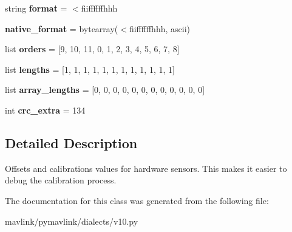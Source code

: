 \begin{DoxyCompactItemize}
\item 
\mbox{\label{classpymavlink_1_1dialects_1_1v10_1_1MAVLink__sensor__offsets__message_a06da8a5406bdc15ad1c584493f8008f8}} 
string {\bfseries format} = \textquotesingle{}$<$fiiffffffhhh\textquotesingle{}
\item 
\mbox{\label{classpymavlink_1_1dialects_1_1v10_1_1MAVLink__sensor__offsets__message_af12cdd0744f15b80aed572658bc3bbff}} 
{\bfseries native\+\_\+format} = bytearray(\textquotesingle{}$<$fiiffffffhhh\textquotesingle{}, \textquotesingle{}ascii\textquotesingle{})
\item 
\mbox{\label{classpymavlink_1_1dialects_1_1v10_1_1MAVLink__sensor__offsets__message_a50876f462a4e2cdf40ddb6a3dd9cd54f}} 
list {\bfseries orders} = \mbox{[}9, 10, 11, 0, 1, 2, 3, 4, 5, 6, 7, 8\mbox{]}
\item 
\mbox{\label{classpymavlink_1_1dialects_1_1v10_1_1MAVLink__sensor__offsets__message_a6f9c5e5df07f175a5e827ae881260cb9}} 
list {\bfseries lengths} = \mbox{[}1, 1, 1, 1, 1, 1, 1, 1, 1, 1, 1, 1\mbox{]}
\item 
\mbox{\label{classpymavlink_1_1dialects_1_1v10_1_1MAVLink__sensor__offsets__message_a5b9eeb85421892f9f426a3464c284a1b}} 
list {\bfseries array\+\_\+lengths} = \mbox{[}0, 0, 0, 0, 0, 0, 0, 0, 0, 0, 0, 0\mbox{]}
\item 
\mbox{\label{classpymavlink_1_1dialects_1_1v10_1_1MAVLink__sensor__offsets__message_a9c347e3d7f05535eaf1f38d7acb93b7a}} 
int {\bfseries crc\+\_\+extra} = 134
\end{DoxyCompactItemize}


\subsection{Detailed Description}
\begin{DoxyVerb}Offsets and calibrations values for hardware sensors. This
makes it easier to debug the calibration process.
\end{DoxyVerb}
 

The documentation for this class was generated from the following file\+:\begin{DoxyCompactItemize}
\item 
mavlink/pymavlink/dialects/v10.\+py\end{DoxyCompactItemize}
